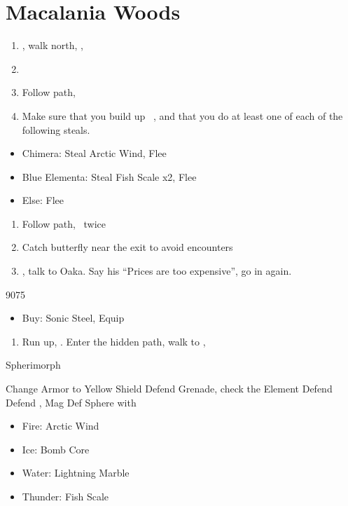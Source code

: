 \chapter{Macalania Woods}

\begin{enumerate}
	\item \sd, walk north, \sd, \save
	\item \formation{\tidus}{\rikku}{\auron}
	\item Follow path, 
	\item Make sure that you build up \rikku\ \od, and that you do at least one of each of the following steals.
\end{enumerate}
\begin{encounters}
\begin{itemize}
	\item Chimera: Steal Arctic Wind, Flee
	\item Blue Elementa: Steal Fish Scale x2, Flee
	\item Else: Flee
\end{itemize}
\end{encounters}
\begin{enumerate}[resume]
	\item Follow path, \sd\ twice
	\item Catch butterfly near the exit to avoid encounters
	\formation{\tidus}{\yuna}{\kimahri}
	\item \save, talk to Oaka. Say his ``Prices are too expensive'', go in again.
\end{enumerate}
\begin{shop}{9075}
\begin{itemize}
	\item Buy: Sonic Steel, Equip
\end{itemize}
\end{shop}
\begin{enumerate}[resume]
	\item Run up, \sd. Enter the hidden path, walk to \auron, \sd
\end{enumerate}
\begin{battle}[12000]{Spherimorph}
\begin{itemize}
	\tidusf Change Armor to Yellow Shield
	\tidusf Defend
	\switch{\tidus}{\rikku}
	\rikkuf Grenade, check the Element
	\kimahrif Defend
	\yunaf Defend
	\rikkuf \od, Mag Def Sphere with
	\begin{itemize}
		\item Fire: Arctic Wind
		\item Ice: Bomb Core
		\item Water: Lightning Marble
		\item Thunder: Fish Scale
	\end{itemize}
\end{itemize}
\end{battle}
